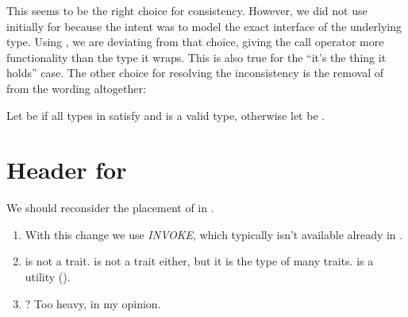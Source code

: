 This seems to be the right choice for consistency.
However, we did not use  initially for  because the
intent was to model the exact interface of the underlying type.
Using , we are deviating from that choice, giving the call operator more
functionality than the type it wraps.
This is also true for the “it's the thing it holds” case.
The other choice for resolving the inconsistency is the removal of  from the
 wording altogether:
\begin{wgText}\setcounter{Paras}{4}
\begin{itemdescr}
\pnum
  Let  be
   if all types in
   satisfy  and
   is a valid type, otherwise
  let  be .
\end{itemdescr}
\end{wgText}

\section{Header for }

We should reconsider the placement of  in .
\begin{enumerate}
  \item With this change we use \emph{INVOKE}, which typically isn't available already in
    .

  \item {} is not a trait.
     is not a trait either, but it is the type of many traits.
     is a utility ().

  \item {}? Too heavy, in my opinion.
\end{enumerate}

